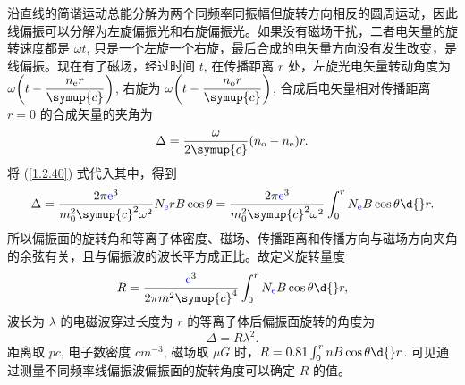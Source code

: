 \documentclass[../天体物理基础.tex]{subfiles}
\begin{document}
沿直线的简谐运动总能分解为两个同频率同振幅但旋转方向相反的圆周运动，因此线偏振可以分解为左旋偏振光和右旋偏振光。如果没有磁场干扰，二者电矢量的旋转速度都是 $\omega t$, 只是一个左旋一个右旋，最后合成的电矢量方向没有发生改变，是线偏振。现在有了磁场，经过时间 $t$, 在传播距离 $r$ 处，左旋光电矢量转动角度为 $\omega\mleft(t-\dfrac{n_{\mathrm{e}}r}{\symup{c}}\mright)$, 右旋为 $\omega\mleft(t-\dfrac{n_{\mathrm{o}}r}{\symup{c}}\mright)$, 合成后电矢量相对传播距离 $r=0$ 的合成矢量的夹角为
\begin{equation}
\Delta=\frac{\omega}{2\symup{c}}\mleft(n_{\mathrm{o}}-n_{\mathrm{e}}\mright) r.
\end{equation}
将 (\ref{1.2.40}) 式代入其中，得到
\begin{equation}
\Delta=\frac{2\pi{\color{blue}{\ce{e}}}^{3}}{m_{0}^{2}\symup{c}^{2}\omega^{2}}N_{{\color{blue}{\ce{e}}}}rB\cos{\theta}=\frac{2\pi{\color{blue}{\ce{e}}}^{3}}{m_{0}^{2}\symup{c}^{2}\omega^{2}}\int_{0}^{r}N_{{\color{blue}{\ce{e}}}}B\cos{\theta}\d{}r.
\end{equation}
所以偏振面的旋转角和等离子体密度、磁场、传播距离和传播方向与磁场方向夹角的余弦有关，且与偏振波的波长平方成正比。故定义旋转量度
\begin{equation}
R=\frac{{\color{blue}{\ce{e}}}^{3}}{2\pi m^{2}\symup{c}^{4}}\int_{0}^{r}N_{{\color{blue}{\ce{e}}}}B\cos{\theta}\d{}r,
\end{equation}
波长为 $\lambda$ 的电磁波穿过长度为 $r$ 的等离子体后偏振面旋转的角度为
\begin{equation}
\Delta=R\lambda^{2}.
\end{equation}
距离取 $\unit{pc}$, 电子数密度 $\unit{cm^{-3}}$, 磁场取 $\unit{\mu G}$ 时，$R=0.81\int_{0}^{r}nB\cos{\theta}\d{}r$. 可见通过测量不同频率线偏振波偏振面的旋转角度可以确定 $R$ 的值。
\end{document}
